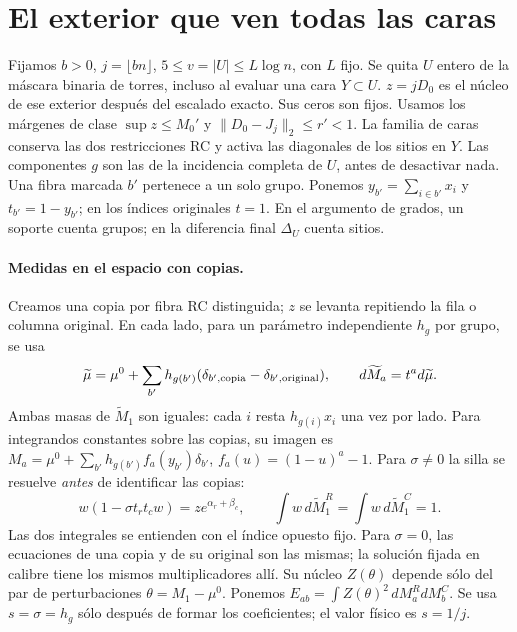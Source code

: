 \section{El exterior que ven todas las caras}
Fijamos $b>0$, $j=\lfloor bn\rfloor$, $5\le v=|U|\le L\log n$, con $L$ fijo.
Se quita $U$ entero de la máscara binaria de torres, incluso al evaluar una cara $Y\subset U$.
$z=jD_0$ es el núcleo de ese exterior después del escalado exacto. Sus ceros son fijos.
Usamos los márgenes de clase $\sup z\le M_0'$ y $\|D_0-J_j\|_2\le r'<1$.
La familia de caras conserva las dos restricciones RC y activa las diagonales de los sitios en $Y$.
Las componentes $g$ son las de la incidencia completa de $U$, antes de desactivar nada.
Una fibra marcada $b'$ pertenece a un solo grupo. Ponemos $y_{b'}=\sum_{i\in b'}x_i$ y
$t_{b'}=1-y_{b'}$; en los índices originales $t=1$.
En el argumento de grados, un soporte cuenta grupos; en la diferencia final $\Delta_U$ cuenta sitios.

\paragraph{Medidas en el espacio con copias.}
Creamos una copia por fibra RC distinguida; $z$ se levanta repitiendo la fila o columna original.
En cada lado, para un parámetro independiente $h_g$ por grupo, se usa
\[
 \widetilde\mu=\mu^0+\sum_{b'}h_{g(b')}
       (\delta_{b',{\rm copia}}-\delta_{b',{\rm original}}),\qquad
 d\widetilde M_a=t^a d\widetilde\mu .
\]
Ambas masas de $\widetilde M_1$ son iguales: cada $i$ resta $h_{g(i)}x_i$ una vez por lado.
Para integrandos constantes sobre las copias, su imagen es
$M_a=\mu^0+\sum_{b'}h_{g(b')} f_a(y_{b'})\delta_{b'}$, $f_a(u)=(1-u)^a-1$.
Para $\sigma\ne0$ la silla se resuelve \emph{antes} de identificar las copias:
\[
 w(1-\sigma t_r t_c w)=z e^{\alpha_r+\beta_c},\qquad
 \int w\,d\widetilde M_1^R=\int w\,d\widetilde M_1^C=1 .
\]
Las dos integrales se entienden con el índice opuesto fijo. Para $\sigma=0$, las ecuaciones
de una copia y de su original son las mismas; la solución fijada en calibre tiene los mismos
multiplicadores allí. Su núcleo $Z(\theta)$ depende sólo del par de perturbaciones
$\theta=M_1-\mu^0$. Ponemos $E_{ab}=\int Z(\theta)^2\,dM_a^R dM_b^C$.
Se usa $s=\sigma=h_g$ sólo después de formar los coeficientes; el valor físico es $s=1/j$.

